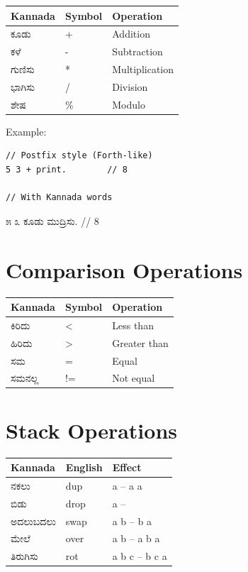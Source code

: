 \documentclass[11pt,a4paper]{report}
\newcommand{\kannada}[1]{{\kannadafont #1}}
\begin{document}
\begin{tabular}{lll}
\toprule
Kannada & Symbol & Operation \\
\midrule
\kannada{ಕೂಡು} & + & Addition \\
\kannada{ಕಳೆ} & - & Subtraction \\
\kannada{ಗುಣಿಸು} & * & Multiplication \\
\kannada{ಭಾಗಿಸು} & / & Division \\
\kannada{ಶೇಷ} & \% & Modulo \\
\bottomrule
\end{tabular}

\vspace{0.5cm}
Example:
\begin{lstlisting}
// Postfix style (Forth-like)
5 3 + print.        // 8

// With Kannada words
\end{lstlisting}
\kannada{೫ ೩ ಕೂಡು ಮುದ್ರಿಸು.} \quad // 8

\section{Comparison Operations}

\begin{tabular}{lll}
\toprule
Kannada & Symbol & Operation \\
\midrule
\kannada{ಕಿರಿದು} & < & Less than \\
\kannada{ಹಿರಿದು} & > & Greater than \\
\kannada{ಸಮ} & = & Equal \\
\kannada{ಸಮನಲ್ಲ} & != & Not equal \\
\bottomrule
\end{tabular}

\section{Stack Operations}

\begin{tabular}{lll}
\toprule
Kannada & English & Effect \\
\midrule
\kannada{ನಕಲು} & dup & a -- a a \\
\kannada{ಬಿಡು} & drop & a -- \\
\kannada{ಅದಲುಬದಲು} & swap & a b -- b a \\
\kannada{ಮೇಲೆ} & over & a b -- a b a \\
\kannada{ತಿರುಗಿಸು} & rot & a b c -- b c a \\
\bottomrule
\end{tabular}
\end{document}
